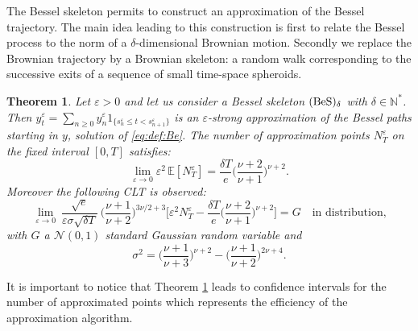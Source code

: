 \documentclass[12pt]{article}
\newcommand{\ds}{\displaystyle}
\newtheorem{thm}{Theorem}[section]
\numberwithin{equation}{section}
\begin{document}
%
%
%
%
The Bessel skeleton permits to construct an approximation of the Bessel trajectory. The main idea leading to this construction is first to relate the Bessel process to the norm of a $\delta$-dimensional Brownian motion. Secondly we replace the Brownian trajectory by a Brownian skeleton: a random walk corresponding to the successive exits of a sequence of small time-space spheroids.
\begin{thm}\label{thm:Bess1}
Let $\varepsilon>0$ and let us consider a Bessel skeleton $({\rm BeS})_{\delta}$ with $\delta\in\mathbb{N}^*$. Then $y^\varepsilon_t=\sum_{n\ge 0}y_n^\varepsilon1_{\{  s_n^\varepsilon \le t<s^\varepsilon_{n+1}\}}$ is an $\varepsilon$-strong approximation of the Bessel paths starting in $y$, solution of \eqref{eq:def:Be}. 
The number of approximation points $N_T^\varepsilon$ on the fixed interval $[0,T]$ satisfies:
\begin{equation}\label{eq:thm:1}
\lim_{\varepsilon\to 0}\varepsilon^2\,\mathbb{E}[N^\varepsilon_T] =\frac{\delta T}{e}\Big(\frac{\nu+2}{\nu+1}\Big)^{\nu+2}. 
\end{equation}
Moreover the following CLT is observed:
\[
\ds\lim_{\varepsilon \to 0}\ \frac{\sqrt{e}}{\varepsilon \sigma\sqrt{\delta T}}\ \Big(\frac{\nu+1}{\nu+2}\Big)^{3\nu/2+3}\Big[ \varepsilon^2 N^\varepsilon_T -\frac{\delta T}{e}\Big( \frac{\nu+2}{\nu+1} \Big)^{\nu+2}\Big] = G \quad \mbox{in distribution,}
\]
with $G$ a $\mathcal{N}(0,1)$ standard Gaussian random variable and 
\begin{equation}
\label{eq:thm:11}
\sigma^2=\Big( \frac{\nu+1}{\nu+3} \Big)^{\nu+2}-\Big(\frac{\nu+1}{\nu+2}\Big)^{2\nu+4}.
\end{equation}
\end{thm}
It is important to notice that Theorem \ref{thm:Bess1} leads to confidence intervals for the number of approximated points which represents the efficiency of the approximation algorithm. 
%
%
%
%
\end{document}
